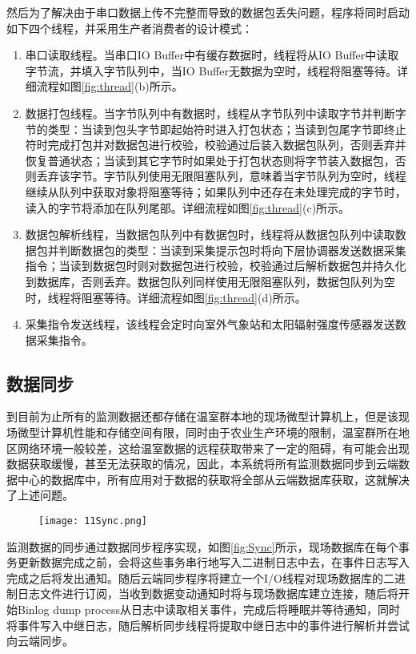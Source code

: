 然后为了解决由于串口数据上传不完整而导致的数据包丢失问题，程序将同时启动如下四个线程，并采用生产者消费者的设计模式：
	\begin{enumerate}
		\item 串口读取线程。当串口IO Buffer中有缓存数据时，线程将从IO Buffer中读取字节流，并填入字节队列中，当IO Buffer无数据为空时，线程将阻塞等待。详细流程如图\ref{fig:thread}(b)所示。
		\item 数据打包线程。当字节队列中有数据时，线程从字节队列中读取字节并判断字节的类型：当读到包头字节即起始符时进入打包状态；当读到包尾字节即终止符时完成打包并对数据包进行校验，校验通过后装入数据包队列，否则丢弃并恢复普通状态；当读到其它字节时如果处于打包状态则将字节装入数据包，否则丢弃该字节。字节队列使用无限阻塞队列，意味着当字节队列为空时，线程继续从队列中获取对象将阻塞等待；如果队列中还存在未处理完成的字节时，读入的字节将添加在队列尾部。详细流程如图\ref{fig:thread}(c)所示。
		\item 数据包解析线程，当数据包队列中有数据包时，线程将从数据包队列中读取数据包并判断数据包的类型：当读到采集提示包时将向下层协调器发送数据采集指令；当读到数据包时则对数据包进行校验，校验通过后解析数据包并持久化到数据库，否则丢弃。数据包队列同样使用无限阻塞队列，数据包队列为空时，线程将阻塞等待。详细流程如图\ref{fig:thread}(d)所示。
		\item 采集指令发送线程，该线程会定时向室外气象站和太阳辐射强度传感器发送数据采集指令。
	\end{enumerate}
	
	\subsection{数据同步}
到目前为止所有的监测数据还都存储在温室群本地的现场微型计算机上，但是该现场微型计算机性能和存储空间有限，同时由于农业生产环境的限制，温室群所在地区网络环境一般较差，这给温室数据的远程获取带来了一定的阻碍，有可能会出现数据获取缓慢，甚至无法获取的情况，因此，本系统将所有监测数据同步到云端数据中心的数据库中，所有应用对于数据的获取将全部从云端数据库获取，这就解决了上述问题。

	\begin{figure}[!htbp]
		\centering
		\texttt{[image: 11Sync.png]}
	\end{figure}
监测数据的同步通过数据同步程序实现，如图\ref{fig:Sync}所示，现场数据库在每个事务更新数据完成之前，会将这些事务串行地写入二进制日志中去，在事件日志写入完成之后将发出通知。随后云端同步程序将建立一个I/O线程对现场数据库的二进制日志文件进行订阅，当收到数据变动通知时将与现场数据库建立连接，随后将开始Binlog dump process从日志中读取相关事件，完成后将睡眠并等待通知，同时将事件写入中继日志，随后解析同步线程将提取中继日志中的事件进行解析并尝试向云端同步。

